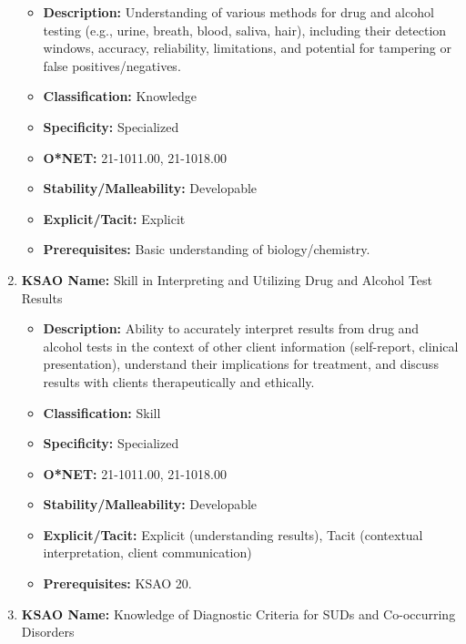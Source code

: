 \documentclass[
  letterpaper,
  DIV=11,
  numbers=noendperiod]{scrartcl}
\providecommand{\tightlist}{%
  \setlength{\itemsep}{0pt}\setlength{\parskip}{0pt}}
\begin{document}
\begin{enumerate}
  \begin{itemize}
  \tightlist
  \item
    \textbf{Description:} Understanding of various methods for drug and
    alcohol testing (e.g., urine, breath, blood, saliva, hair),
    including their detection windows, accuracy, reliability,
    limitations, and potential for tampering or false
    positives/negatives.
  \item
    \textbf{Classification:} Knowledge
  \item
    \textbf{Specificity:} Specialized
  \item
    \textbf{O*NET:} 21-1011.00, 21-1018.00
  \item
    \textbf{Stability/Malleability:} Developable
  \item
    \textbf{Explicit/Tacit:} Explicit
  \item
    \textbf{Prerequisites:} Basic understanding of biology/chemistry.
  \end{itemize}
\item
  \textbf{KSAO Name:} Skill in Interpreting and Utilizing Drug and
  Alcohol Test Results

  \begin{itemize}
  \tightlist
  \item
    \textbf{Description:} Ability to accurately interpret results from
    drug and alcohol tests in the context of other client information
    (self-report, clinical presentation), understand their implications
    for treatment, and discuss results with clients therapeutically and
    ethically.
  \item
    \textbf{Classification:} Skill
  \item
    \textbf{Specificity:} Specialized
  \item
    \textbf{O*NET:} 21-1011.00, 21-1018.00
  \item
    \textbf{Stability/Malleability:} Developable
  \item
    \textbf{Explicit/Tacit:} Explicit (understanding results), Tacit
    (contextual interpretation, client communication)
  \item
    \textbf{Prerequisites:} KSAO 20.
  \end{itemize}
\item
  \textbf{KSAO Name:} Knowledge of Diagnostic Criteria for SUDs and
  Co-occurring Disorders


\end{enumerate}
\end{document}
